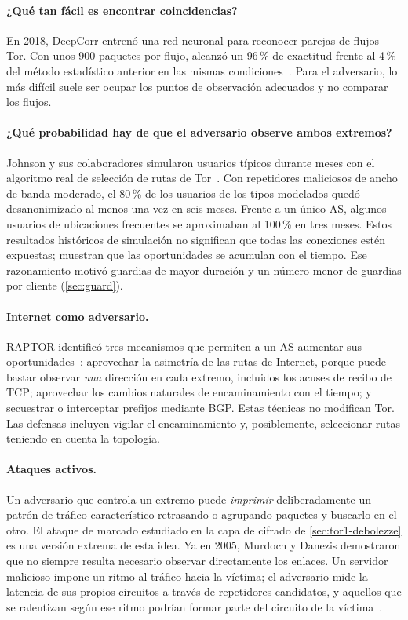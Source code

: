 \paragraph{¿Qué tan fácil es encontrar coincidencias?} En 2018, DeepCorr entrenó una red neuronal para reconocer parejas de flujos Tor. Con unos 900 paquetes por flujo, alcanzó un 96\,\% de exactitud frente al 4\,\% del método estadístico anterior en las mismas condiciones~\cite{nasr2018deepcorr}. Para el adversario, lo más difícil suele ser ocupar los puntos de observación adecuados y no comparar los flujos.

\paragraph{¿Qué probabilidad hay de que el adversario observe ambos extremos?} Johnson y sus colaboradores simularon usuarios típicos durante meses con el algoritmo real de selección de rutas de Tor~\cite{johnson2013users}. Con repetidores maliciosos de ancho de banda moderado, el 80\,\% de los usuarios de los tipos modelados quedó desanonimizado al menos una vez en seis meses. Frente a un único AS, algunos usuarios de ubicaciones frecuentes se aproximaban al 100\,\% en tres meses. Estos resultados históricos de simulación no significan que todas las conexiones estén expuestas; muestran que las oportunidades se acumulan con el tiempo. Ese razonamiento motivó guardias de mayor duración y un número menor de guardias por cliente (\cref{sec:guard}).

\paragraph{Internet como adversario.} RAPTOR identificó tres mecanismos que permiten a un AS aumentar sus oportunidades~\cite{sun2015raptor}: aprovechar la asimetría de las rutas de Internet, porque puede bastar observar \emph{una} dirección en cada extremo, incluidos los acuses de recibo de TCP; aprovechar los cambios naturales de encaminamiento con el tiempo; y secuestrar o interceptar prefijos mediante BGP. Estas técnicas no modifican Tor. Las defensas incluyen vigilar el encaminamiento y, posiblemente, seleccionar rutas teniendo en cuenta la topología.

\paragraph{Ataques activos.} Un adversario que controla un extremo puede \emph{imprimir} deliberadamente un patrón de tráfico característico retrasando o agrupando paquetes y buscarlo en el otro. El ataque de marcado estudiado en la capa de cifrado de \cref{sec:tor1-debolezze} es una versión extrema de esta idea. Ya en 2005, Murdoch y Danezis demostraron que no siempre resulta necesario observar directamente los enlaces. Un servidor malicioso impone un ritmo al tráfico hacia la víctima; el adversario mide la latencia de sus propios circuitos a través de repetidores candidatos, y aquellos que se ralentizan según ese ritmo podrían formar parte del circuito de la víctima~\cite{murdoch2005lowcost}.

